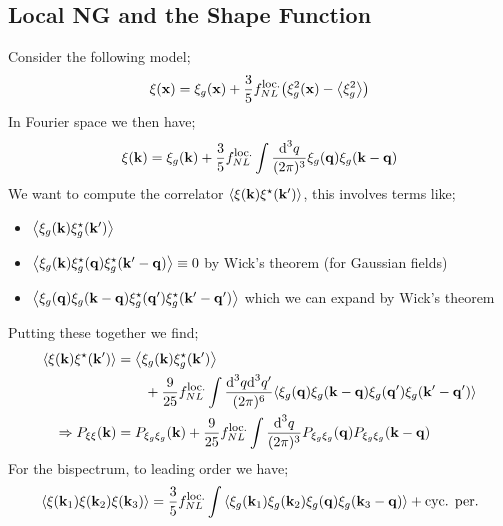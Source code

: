 \subsection{Local NG and the Shape Function}
Consider the following model;
\begin{equation}
\xi(\vec{x}) = \xi_g(\vec{x}) + \frac{3}{5}f_{NL}^{\text{\footnotesize{loc.}}}\left(\xi_g^2(\vec{x}) - \left< \xi_g^2 \right>\right)
\end{equation}
In Fourier space we then have;
\begin{equation*}
\xi(\mathbf{k}) = \xi_g(\mathbf{k}) + \frac{3}{5}f_{NL}^{\text{\footnotesize{loc.}}} \int{\frac{\text{d}^3 q}{(2\pi)^3}\xi_g(\mathbf{q})\xi_g(\mathbf{k} - \mathbf{q})}
\end{equation*}
We want to compute the correlator $\left< \xi(\vec{k})\xi^{\star}(\vec{k}\pr) \right>$, this involves terms like;
\begin{itemize}
\item $\left< \xi_g(\vec{k})\xi_g^{\star}(\vec{k}\pr) \right>$
\item $\left< \xi_g(\vec{k})\xi_g^{\star}(\vec{q})\xi_g^{\star}(\vec{k}\pr -\vec{q}) \right> \equiv 0$ by Wick's theorem (for Gaussian fields)
\item $\left< \xi_g(\vec{q})\xi_g(\vec{k} - \vec{q})\xi^{\star}_g(\vec{q}\pr)\xi_g^{\star}(\vec{k}\pr - \vec{q}\pr) \right>$ which we can expand by Wick's theorem
\end{itemize}
Putting these together we find;
\begin{align*}
\left< \xi(\vec{k})\xi^{\star}(\vec{k}\pr) \right> &= \left< \xi_g(\vec{k})\xi_g^{\star}(\vec{k}\pr) \right> \\
&\qquad + \frac{9}{25}f_{NL}^{\text{\footnotesize{loc.}}} \int{\frac{\ud^3 q \ud^3 q\pr}{(2\pi)^6}\left< \xi_g(\vec{q})\xi_g(\vec{k} - \vec{q})\xi_g(\vec{q}\pr)\xi_g(\vec{k}\pr - \vec{q}\pr) \right>} \\
\Rightarrow P_{\xi\xi}(\vec{k}) &= P_{\xi_g \xi_g}(\vec{k}) + \frac{9}{25}f_{NL}^{\text{\footnotesize{loc.}}}\int{\frac{\ud^3 q}{(2\pi)^3}P_{\xi_g\xi_g}(\vec{q})P_{\xi_g \xi_g}(\vec{k} - \vec{q})}
\end{align*}
For the bispectrum, to leading order we have;
\begin{equation*}
\left< \xi(\vec{k}_1)\xi(\vec{k}_2)\xi(\vec{k}_3) \right> = \frac{3}{5}f_{NL}^{\text{\footnotesize{loc.}}}\int{\left< \xi_g(\vec{k}_1)\xi_g(\vec{k}_2) \xi_g(\vec{q})\xi_g(\vec{k}_3 - \vec{q})\right>} + \text{cyc. per.}
\end{equation*}
